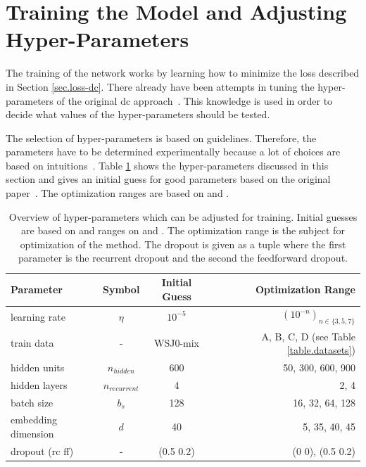 \section{Training the Model and Adjusting Hyper-Parameters}\label{sec.training}

The training of the network works by learning how to minimize the loss described in Section \ref{sec.loss-dc}. There already have been attempts in tuning the hyper-parameters of the original \gls{dc} approach~\cite{Isik2016}. This knowledge is used in order to decide what values of the hyper-parameters should be tested.

The selection of hyper-parameters is based on guidelines. Therefore, the parameters have to be determined experimentally because a lot of choices are based on intuitions~\cite{Greff2017}.
Table \ref{table.hyper-parameters} shows the hyper-parameters discussed in this section and gives an initial guess for good parameters based on the original paper~\cite{Hershey2016}. The optimization ranges are based on \cite{Isik2016} and \cite{Greff2017}.

\begin{table}[ht]
	\centering
	\begin{tabularx}{.9\textwidth}{lccr}
		Parameter                       & Symbol          & Initial Guess & Optimization Range 	\tabularnewline
		\midrule
		learning rate                   & $\eta$          & $10^{-5}$     & $(10^{-n})_{n \in \{3,5,7\}}$  \tabularnewline
		\midrule
		train data                  & -               & WSJ0-mix      & A, B, C, D (see Table \ref{table.datasets}) \tabularnewline
		\midrule
		hidden units                    & $n_{hidden}$    & 600           & 50, 300, 600, 900 \tabularnewline
		\midrule
		hidden layers                   & $n_{recurrent}$ & 4             & 2, 4 \tabularnewline
		\midrule
		batch size                      & $b_s$           & 128           & 16, 32, 64, 128  \tabularnewline
		\midrule
		embedding dimension             & $d$             & 40            & 5, 35, 40, 45 \tabularnewline
		\midrule
		dropout (rc ff) & -               & (0.5 0.2)     & (0 0), (0.5 0.2) \tabularnewline
		\midrule
	\end{tabularx}
	\caption{Overview of hyper-parameters which can be adjusted for training. Initial guesses are based on \cite{Hershey2016} and ranges on \cite{Isik2016} and \cite{Greff2017}. The optimization range is the subject for optimization of the method. The dropout is given as a tuple where the first parameter is the recurrent dropout and the second the feedforward dropout.}
	\label{table.hyper-parameters}
\end{table}

